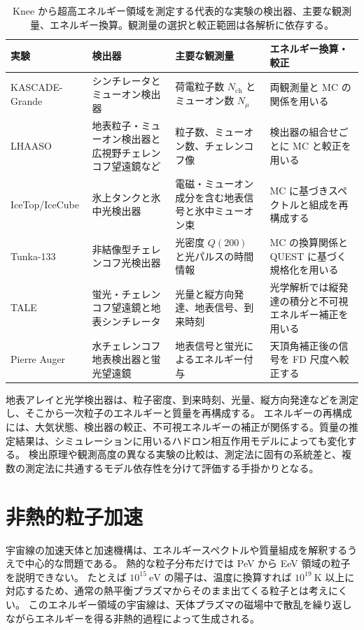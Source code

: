\documentclass[book,paper=a4,fontsize=11pt]{jlreq}
\begin{document}
\begin{table}[htb]
  \centering
  \small
  \caption{Knee から超高エネルギー領域を測定する代表的な実験の検出器、主要な観測量、エネルギー換算。観測量の選択と較正範囲は各解析に依存する。}
  \label{tab:cosmic_ray_experiments}
  \begin{tabular}{@{}p{0.16\hsize}p{0.22\hsize}p{0.24\hsize}p{0.25\hsize}@{}}
    \hline
    実験 & 検出器 & 主要な観測量 & エネルギー換算・較正 \\
    \hline
    KASCADE-Grande & シンチレータとミューオン検出器 & 荷電粒子数 \(N_{\mathrm{ch}}\) とミューオン数 \(N_\mu\) & 両観測量と MC の関係を用いる~\cite{KASCADEGrandeHeavyKnee2011} \\
    LHAASO & 地表粒子・ミューオン検出器と広視野チェレンコフ望遠鏡など & 粒子数、ミューオン数、チェレンコフ像 & 検出器の組合せごとに MC と較正を用いる~\cite{LHAASOKnee2024,LHAASOProton2025} \\
    IceTop/IceCube & 氷上タンクと氷中光検出器 & 電磁・ミューオン成分を含む地表信号と氷中ミューオン束 & MC に基づきスペクトルと組成を再構成する~\cite{IceTopComposition2019} \\
    Tunka-133 & 非結像型チェレンコフ光検出器 & 光密度 \(Q(200)\) と光パルスの時間情報 & MC の換算関係と QUEST に基づく規格化を用いる~\cite{TunkaSpectrum2020} \\
    TALE & 蛍光・チェレンコフ望遠鏡と地表シンチレータ & 光量と縦方向発達、地表信号、到来時刻 & 光学解析では縦発達の積分と不可視エネルギー補正を用いる~\cite{TALESpectrum2018,TALEMassComposition2026} \\
    Pierre Auger & 水チェレンコフ地表検出器と蛍光望遠鏡 & 地表信号と蛍光によるエネルギー付与 & 天頂角補正後の信号を FD 尺度へ較正する~\cite{AugerSecondKnee2021} \\
    \hline
  \end{tabular}
\end{table}
\FloatBarrier

地表アレイと光学検出器は、粒子密度、到来時刻、光量、縦方向発達などを測定し、そこから一次粒子のエネルギーと質量を再構成する。
エネルギーの再構成には、大気状態、検出器の較正、不可視エネルギーの補正が関係する。質量の推定結果は、シミュレーションに用いるハドロン相互作用モデルによっても変化する。
検出原理や観測高度の異なる実験の比較は、測定法に固有の系統差と、複数の測定法に共通するモデル依存性を分けて評価する手掛かりとなる。

\section{非熱的粒子加速}\label{subsec:acceleration_need}\label{subsec:fermi_acceleration}
宇宙線の加速天体と加速機構は、エネルギースペクトルや質量組成を解釈するうえで中心的な問題である。
熱的な粒子分布だけでは PeV から EeV 領域の粒子を説明できない。
たとえば \(10^{15}\ \mathrm{eV}\) の陽子は、温度に換算すれば \(10^{19}\ \mathrm{K}\) 以上に対応するため、通常の熱平衡プラズマからそのまま出てくる粒子とは考えにくい。
このエネルギー領域の宇宙線は、天体プラズマの磁場中で散乱を繰り返しながらエネルギーを得る非熱的過程によって生成される。
\end{document}
